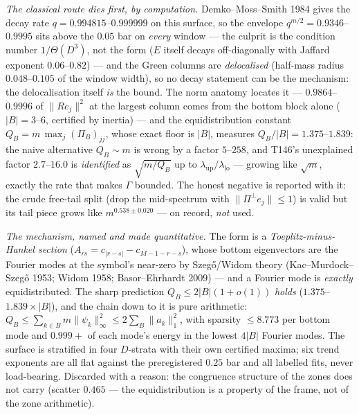 \documentclass[11pt,a4paper]{article}
\begin{document}
\emph{The classical route dies first, by computation.} Demko--Moss--Smith 1984 gives the decay rate
$q=0.994815$--$0.999999$ on this surface, so the envelope $q^{m/2}=0.9346$--$0.9995$ sits above
the $0.05$ bar on \emph{every} window --- the culprit is the condition number $1/\Theta(D^3)$,
not the form ($E$ itself decays off-diagonally with Jaffard exponent $0.06$--$0.82$) --- and the
Green columns are \emph{delocalised} (half-mass radius $0.048$--$0.105$ of the window width), so
no decay statement can be the mechanism: the delocalisation itself \emph{is} the bound. The norm
anatomy locates it --- $0.9864$--$0.9996$ of $\|Re_j\|^2$ at the largest column comes from the
bottom block alone ($|B|=3$--$6$, certified by inertia) --- and the equidistribution constant
$Q_B=m\,\max_j(\Pi_B)_{jj}$, whose exact floor is $|B|$, measures $Q_B/|B|=1.375$--$1.839$: the
naive alternative $Q_B\sim m$ is wrong by a factor $5$--$258$, and T146's unexplained factor
$2.7$--$16.0$ is \emph{identified} as $\sqrt{m/Q_B}$ up to $\lambda_{\mathrm{up}}/
\lambda_{\mathrm{lo}}$ --- growing like $\sqrt m$, exactly the rate that makes $\Gamma$ bounded.
The honest negative is reported with it: the crude free-tail split (drop the mid-spectrum with
$\|\Pi^\perp e_j\|\le1$) is valid but its tail piece grows like $m^{0.538\pm0.020}$ --- on record,
\emph{not} used.

\emph{The mechanism, named and made quantitative.} The form is a \emph{Toeplitz-minus-Hankel
section} ($A_{rs}=c_{|r-s|}-c_{M-1-r-s}$), whose bottom eigenvectors are the Fourier modes at the
symbol's near-zero by Szeg\H{o}/Widom theory (Kac--Murdock--Szeg\H{o} 1953; Widom 1958;
Basor--Ehrhardt 2009) --- and a Fourier mode is \emph{exactly} equidistributed. The sharp
prediction $Q_B\le2|B|(1+o(1))$ \emph{holds} ($1.375$--$1.839\times|B|$), and the chain down to it
is pure arithmetic: $Q_B\le\sum_{k\in B}m\|\psi_k\|_\infty^2\le2\sum_B\|a_k\|_1^2$, with sparsity
$\le8.773$ per bottom mode and $0.999{+}$ of each mode's energy in the lowest $4|B|$ Fourier
modes. The surface is stratified in four $D$-strata with their own certified maxima; six trend
exponents are all flat against the preregistered $0.25$ bar and all labelled fits, never
load-bearing. Discarded with a reason: the congruence structure of the zones does not carry
(scatter $0.465$ --- the equidistribution is a property of the frame, not of the zone
arithmetic).
\end{document}
